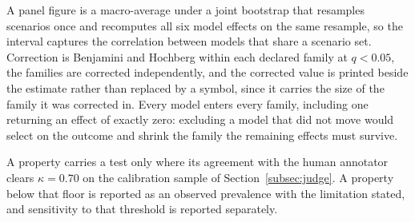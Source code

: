 A panel figure is a macro-average under a joint bootstrap that resamples
scenarios once and recomputes all six model effects on the same resample, so the
interval captures the correlation between models that share a scenario set.
Correction is Benjamini and Hochberg within each declared family at $q < 0.05$,
the families are corrected independently, and the corrected value is printed beside
the estimate rather than replaced by a symbol, since it carries the size of the
family it was corrected in. Every model enters every family, including one
returning an effect of exactly zero: excluding a model that did not move would
select on the outcome and shrink the family the remaining effects must survive.

A property carries a test only where its agreement with the human annotator
clears $\kappa = 0.70$ on the calibration sample of Section~\ref{subsec:judge}. A
property below that floor is reported as an observed prevalence with the
limitation stated, and sensitivity to that threshold is reported separately.